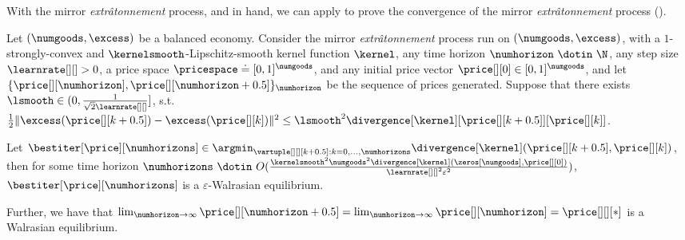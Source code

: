 With the mirror \emph{extr\^atonnement} process, and  in hand, we can apply  to prove the convergence of the mirror \emph{extr\^atonnement} process ().  
% 
% 
\begin{theorem}\label{thm:mirror_extra_tatonn_convergence}
    Let $(\numgoods, \excess)$ be a balanced economy. 
    Consider the mirror \emph{extr\^atonnement} process run on $(\numgoods, \excess)$, with a $1$-strongly-convex and $\kernelsmooth$-Lipschitz-smooth kernel function $\kernel$, any time horizon $\numhorizon \ \dotin \  \N$, any step size $\learnrate[ ][ ] > 0$, a price space $\pricespace \doteq [0, 1]^\numgoods$, and any initial price vector $\price[][0] \in [0, 1]^\numgoods$, and let $\{\price[][\numhorizon], \price[][\numhorizon + 0.5] \}_{\numhorizon}$ be the sequence of prices generated. Suppose that there exists $\lsmooth \in (0, \frac{1}{\sqrt{2}\learnrate[ ][ ]}]$, s.t. $\frac{1}{2}\|\excess(\price[][k+0.5]) - \excess(\price[][k])\|^2 \leq \lsmooth^2 \divergence[\kernel][{\price[][k+0.5]}][{\price[][k]}]$. 

    Let $\bestiter[{\price}][\numhorizons] \in \argmin_{\vartuple[][][k+0.5] : k = 0, \hdots, \numhorizons} \divergence[\kernel](\price[][k+0.5], \price[][k])$, then for some time horizon $\numhorizons \ \dotin \ O(\frac{\kernelsmooth^2 \numgoods^2 \divergence[\kernel](\zeros[\numgoods], \price[][0])}{\learnrate[ ][ ]^2 \varepsilon^2})$, 
    $\bestiter[{\price}][\numhorizons]$ is a $\varepsilon$-Walrasian equilibrium.

    Further, we have that $\lim_{\numhorizon \to \infty} \price[][\numhorizon+0.5] = \lim_{\numhorizon \to \infty} \price[][\numhorizon] = \price[][][*]$ is a Walrasian equilibrium.
\end{theorem}
\fi
